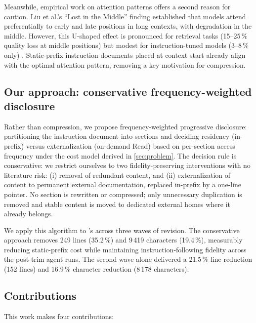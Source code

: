 Meanwhile, empirical work on attention patterns offers a second reason
for caution. Liu et al.'s ``Lost in the Middle'' finding established
that models attend preferentially to early and late positions in long
contexts, with degradation in the middle. However, this U-shaped effect
is pronounced for retrieval tasks (15--25\,\% quality loss at middle
positions) but modest for instruction-tuned models (3--8\,\% only)
\cite{lostinmiddle}. Static-prefix instruction documents placed at
context start already align with the optimal attention pattern,
removing a key motivation for compression.

\subsection*{Our approach: conservative frequency-weighted disclosure}

Rather than compression, we propose frequency-weighted progressive
disclosure: partitioning the instruction document into sections and
deciding residency (in-prefix) versus externalization (on-demand Read)
based on per-section access frequency under the cost model derived in
\cref{sec:problem}. The decision rule is conservative: we restrict
ourselves to two fidelity-preserving interventions with no literature
risk: (i) removal of redundant content, and (ii) externalization of
content to permanent external documentation, replaced in-prefix by a
one-line pointer. No section is rewritten or compressed; only
unnecessary duplication is removed and stable content is moved to
dedicated external homes where it already belongs.

We apply this algorithm to \blackrim's \claudemd across three waves of
revision. The conservative approach removes 249 lines (35.2\,\%)
and 9\,419 characters (19.4\,\%), measurably reducing static-prefix
cost while maintaining instruction-following fidelity across the
post-trim agent runs. The second wave alone delivered a 21.5\,\% line
reduction (152 lines) and 16.9\,\% character reduction (8\,178 characters).

\subsection*{Contributions}

This work makes four contributions:

